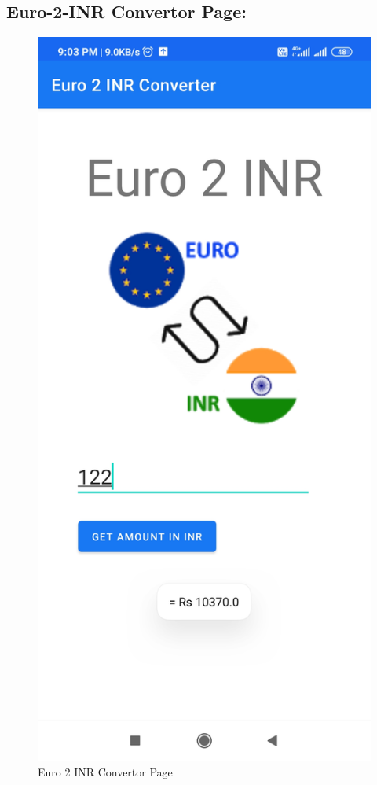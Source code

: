 \documentclass[12pt]{article}
\begin{document}
\subsection{Euro-2-INR Convertor Page:}

\begin{figure}[h]
\centering
\includegraphics[scale=0.13]{146977771-f8aff4ba-14fa-4c17-8481-41be63a5799c.jpg}
\caption{Euro 2 INR Convertor Page}
\label{Euro 2 INR Convertor Page}
\end{figure}
\end{document}
